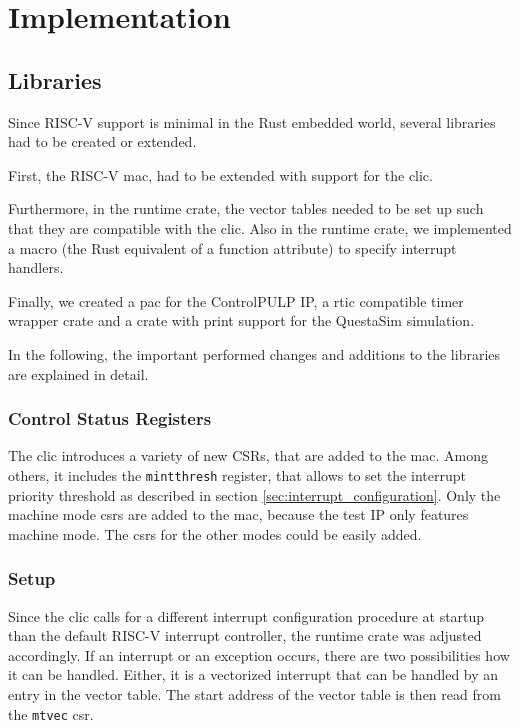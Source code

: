 \chapter{Implementation}
\label{ch:implementation}

\section{Libraries}
\label{sec:libraries}
Since RISC-V support is minimal in the Rust embedded world, several libraries had to be created or extended.

First, the RISC-V \gls{mac}, had to be extended with support for the \gls{clic}.

Furthermore, in the runtime crate, the vector tables needed to be set up such that they are compatible with the \gls{clic}. Also in the runtime crate, we implemented a macro (the Rust equivalent of a function attribute) to specify interrupt handlers.

Finally, we created a \gls{pac} for the ControlPULP IP, a \gls{rtic} compatible timer wrapper crate and a crate with print support for the QuestaSim simulation.

In the following, the important performed changes and additions to the libraries are explained in detail.

\subsection{Control Status Registers}
The \gls{clic} introduces a variety of new CSRs, that are added to the \gls{mac}. Among others, it includes the \texttt{mintthresh} register, that allows to set the interrupt priority threshold as described in section \ref{sec:interrupt_configuration}. Only the machine mode \gls{csr}s are added to the \gls{mac}, because the test IP only features machine mode. The \gls{csr}s for the other modes could be easily added.

\subsection{Setup}
Since the \gls{clic} calls for a different interrupt configuration procedure at startup than the default RISC-V interrupt controller, the runtime crate was adjusted accordingly.
If an interrupt or an exception occurs, there are two possibilities how it can be handled.
Either, it is a vectorized interrupt that can be handled by an entry in the vector table. The start address of the vector table is then read from the \texttt{mtvec} \gls{csr}. 

